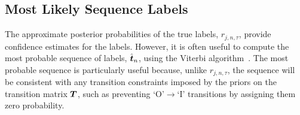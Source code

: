 \subsection{Most Likely Sequence Labels}

The approximate posterior probabilities of the true labels, $r_{j,n,\tau}$, provide confidence estimates for the labels. However, it is often useful to  compute 
the most probable sequence of labels, $\hat{\boldsymbol t}_n$, using the
Viterbi algorithm~\cite{viterbi1967error}. 
The most probable sequence is particularly useful because, unlike $r_{j,n,\tau}$,
the sequence will be consistent with any transition 
constraints imposed by the priors on the transition matrix $\boldsymbol T$, 
such as preventing `O'$\rightarrow$`I' transitions by assigning them zero probability.


